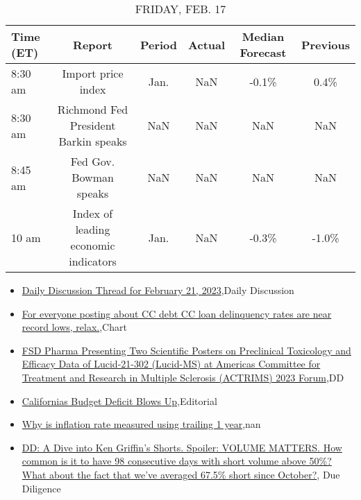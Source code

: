 \documentclass{article}%
\begin{document}
\begin{table}[htbp]%
\caption{FRIDAY, FEB. 17}%
\centering%
\begin{adjustbox}{width=1\textwidth}%
\begin{tabular}{lccccc}
\toprule
Time (ET) &                               Report & Period & Actual & Median Forecast & Previous \\
\midrule
  8:30 am &                   Import price index &   Jan. &    NaN &           -0.1\% &     0.4\% \\
  8:30 am & Richmond Fed President Barkin speaks &    NaN &    NaN &             NaN &      NaN \\
  8:45 am &               Fed Gov. Bowman speaks &    NaN &    NaN &             NaN &      NaN \\
    10 am & Index of leading economic indicators &   Jan. &    NaN &           -0.3\% &    -1.0\% \\
\bottomrule
\end{tabular}
%
\end{adjustbox}%
\end{table}

%
\begin{itemize}%
\item%
\href{https://reddit.com/r/wallstreetbets/comments/1180thi/daily\_discussion\_thread\_for\_february\_21\_2023/}{Daily Discussion Thread for February 21, 2023},Daily Discussion%
\item%
\href{https://reddit.com/r/wallstreetbets/comments/117youv/for\_everyone\_posting\_about\_cc\_debt\_cc\_loan/}{For everyone posting about CC debt CC loan delinquency rates are near record lows, relax.},Chart%
\item%
\href{https://reddit.com/r/Baystreetbets/comments/1181poi/fsd\_pharma\_presenting\_two\_scientific\_posters\_on/}{FSD Pharma Presenting Two Scientific Posters on Preclinical Toxicology and Efficacy Data of Lucid-21-302 (Lucid-MS) at Americas Committee for Treatment and Research in Multiple Sclerosis (ACTRIMS) 2023 Forum},DD%
\item%
\href{https://reddit.com/r/Economics/comments/117uqwe/californias\_budget\_deficit\_blows\_up/}{Californias Budget Deficit Blows Up},Editorial%
\item%
\href{https://reddit.com/r/Economics/comments/117ubkk/why\_is\_inflation\_rate\_measured\_using\_trailing\_1/}{Why is inflation rate measured using trailing 1 year},nan%
\item%
\href{https://reddit.com/r/Superstonk/comments/1181da7/dd\_a\_dive\_into\_ken\_griffins\_shorts\_spoiler\_volume/}{DD: A Dive into Ken Griffin's Shorts. Spoiler: VOLUME MATTERS. How common is it to have 98 consecutive days with short volume above 50\%? What about the fact that we've averaged 67.5\% short since October?}, Due Diligence%
\end{itemize}%
\end{document}
